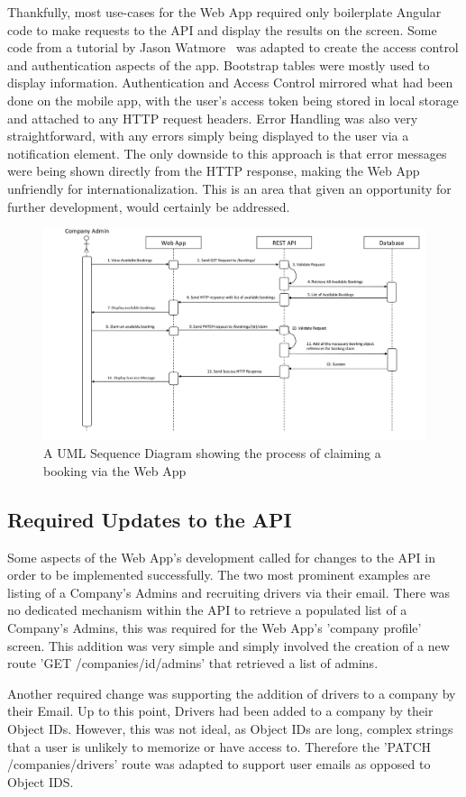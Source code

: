 Thankfully, most use-cases for the Web App required only boilerplate Angular code to make requests to the API and display the results on the screen. Some code from a tutorial by Jason Watmore~\cite{angular_tutorial_ref} was adapted to create the access control and authentication aspects of the app. Bootstrap tables were mostly used to display information. Authentication and Access Control mirrored what had been done on the mobile app, with the user's access token being stored in local storage and attached to any HTTP request headers. Error Handling was also very straightforward, with any errors simply being displayed to the user via a notification element. The only downside to this approach is that error messages were being shown directly from the HTTP response, making the Web App unfriendly for internationalization. This is an area that given an opportunity for further development, would certainly be addressed.

\begin{figure}[!htb]
	\centering
	\includegraphics[width=\linewidth]{Resources/img/booking_claim_sequence.png}
	\caption{A UML Sequence Diagram showing the process of claiming a booking via the Web App}
	\label{fig:booking_claim_sequence}
\end{figure}

\subsection{Required Updates to the API}
Some aspects of the Web App's development called for changes to the API in order to be implemented successfully. The two most prominent examples are listing of a Company's Admins and recruiting drivers via their email. There was no dedicated mechanism within the API to retrieve a populated list of a Company's Admins, this was required for the Web App's 'company profile' screen. This addition was very simple and simply involved the creation of a new route 'GET /companies/{id}/admins' that retrieved a list of admins.

Another required change was supporting the addition of drivers to a company by their Email. Up to this point, Drivers had been added to a company by their Object IDs. However, this was not ideal, as Object IDs are long, complex strings that a user is unlikely to memorize or have access to. Therefore the 'PATCH /companies/drivers' route was adapted to support user emails as opposed to Object IDS.

